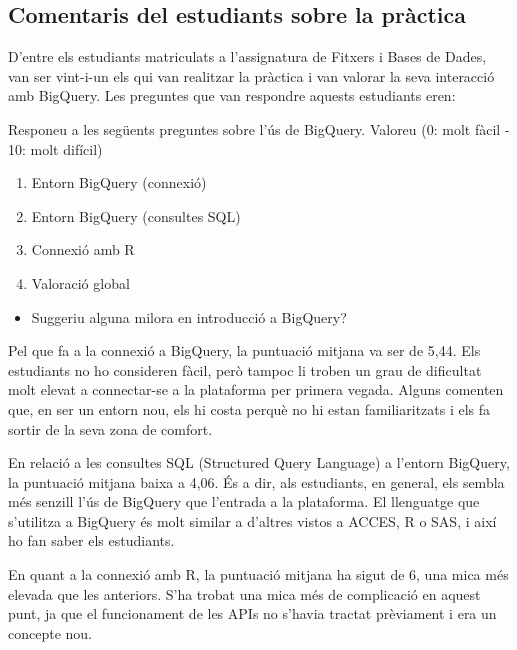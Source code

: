 \documentclass[11pt,longbibliography]{article}
\theoremstyle{definition}
\theoremstyle{remark}
\begin{document}
\subsection{Comentaris del estudiants sobre la pràctica}

D'entre els estudiants matriculats a l'assignatura de Fitxers i Bases de Dades, van ser vint-i-un els qui van realitzar la pràctica i van valorar la seva interacció amb BigQuery. Les preguntes que van respondre aquests estudiants eren:


Responeu a les següents preguntes sobre l'ús de BigQuery. Valoreu (0: molt fàcil - 10: molt difícil)


\begin{enumerate}

\item Entorn BigQuery (connexió)

\item Entorn BigQuery (consultes SQL)

\item Connexió amb R

\item Valoració global

\end{enumerate}

\begin{itemize}

\item Suggeriu alguna milora en introducció a BigQuery?

\end{itemize}


Pel que fa a la connexió a BigQuery, la puntuació mitjana va ser de 5,44. Els estudiants no ho consideren fàcil, però tampoc li troben un grau de dificultat molt elevat a connectar-se a la plataforma per primera vegada. Alguns comenten que, en ser un entorn nou, els hi costa perquè no hi estan familiaritzats i els fa sortir de la seva zona de comfort.


En relació a les consultes SQL (Structured Query Language) a l'entorn BigQuery, la puntuació mitjana baixa a 4,06. És a dir, als estudiants, en general, els sembla més senzill l'ús de BigQuery que l'entrada a la plataforma. El llenguatge que s'utilitza a BigQuery és molt similar a d'altres vistos a ACCES, R o SAS, i així ho fan saber els estudiants.


En quant a la connexió amb R, la puntuació mitjana ha sigut de 6, una mica més elevada que les anteriors. S'ha trobat una mica més de complicació en aquest punt, ja que el funcionament de les APIs no s'havia tractat prèviament i era un concepte nou.
\end{document}

